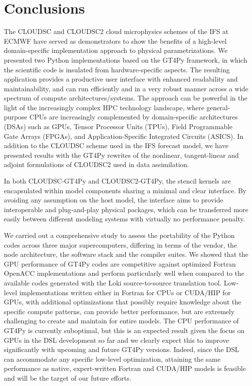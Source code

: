 \documentclass[gmd,manuscript,online]{copernicus}
\theoremstyle{theorem}
\theoremstyle{definition}
\theoremstyle{remark}
\theoremstyle{proposition}
\begin{document}
	\section{Conclusions}
	\label{section:conclusions}

	The CLOUDSC and CLOUDSC2 cloud microphysics schemes of the IFS at ECMWF have served as demonstrators to show the benefits of a high-level domain-specific implementation approach to physical parametrizations. We presented two Python implementations based on the GT4Py framework, in which the scientific code is insulated from hardware-specific aspects. The resulting application provides a productive user interface with enhanced readability and maintainability, and can run efficiently and in a very robust manner across a wide spectrum of compute architectures/systems. The approach can be powerful in the light of the increasingly complex HPC technology landscape, where general-purpose CPUs are increasingly complemented by domain-specific architectures (DSAs) such as GPUs, Tensor Processor Units (TPUs), Field Programmable Gate Arrays (FPGAs), and Application-Specific Integrated Circuits (ASICS). In addition to the CLOUDSC scheme used in the IFS forecast model, we have presented results with the GT4Py rewrites of the nonlinear, tangent-linear and adjoint formulations of CLOUDSC2 used in data assimilation.

	In both CLOUDSC-GT4Py and CLOUDSC2-GT4Py, the stencil kernels are encapsulated within model components sharing a minimal and clear interface. By avoiding any assumption on the host model, the interface aims to provide interoperable and plug-and-play physical packages, which can be transferred more easily between different modeling systems with virtually no performance penalty.

	We carried out a comprehensive study to assess the portability of the Python codes across three major supercomputers, differing in terms of the vendor, the node architecture, the software stack and the compiler suites. We showed that the GPU performance of GT4Py codes are competitive against optimized Fortran OpenACC implementations and perform particularly well when compared to the available codes generated with the Loki source-to-source translation tool. Low-level implementations written either in Fortran for CPUs or CUDA/HIP for GPUs, with additional optimizations that possibly require knowledge about the specific compute patterns, can provide better performance, but are extremely challenging to create and maintain for entire models. The CPU performance of GT4Py is currently suboptimal, but this is an expected result given the focus on GPUs in the DSL development so far and we clearly expect this to improve significantly with upcoming and future GT4Py versions. Indeed, since the DSL can accommodate any specific low-level optimization, attaining the same performance as native, expert-written Fortran and CUDA/HIP models is feasible and will be the target of our future efforts.
\end{document}
